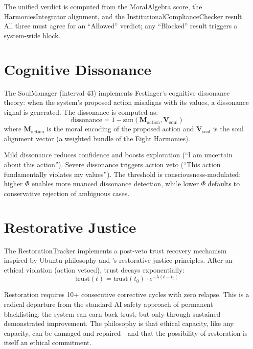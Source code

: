 \documentclass[12pt]{book}
\begin{document}
The unified verdict is computed from the MoralAlgebra score, the HarmoniesIntegrator alignment, and the InstitutionalComplianceChecker result. All three must agree for an ``Allowed'' verdict; any ``Blocked'' result triggers a system-wide block.

\section{Cognitive Dissonance}

The SoulManager (interval 43) implements Festinger's cognitive dissonance theory: when the system's proposed action misaligns with its values, a dissonance signal is generated. The dissonance is computed as:
\begin{equation}
\text{dissonance} = 1 - \text{sim}(\mathbf{M}_{\text{action}}, \mathbf{V}_{\text{soul}})
\end{equation}
where $\mathbf{M}_{\text{action}}$ is the moral encoding of the proposed action and $\mathbf{V}_{\text{soul}}$ is the soul alignment vector (a weighted bundle of the Eight Harmonies).

Mild dissonance reduces confidence and boosts exploration (``I am uncertain about this action''). Severe dissonance triggers action veto (``This action fundamentally violates my values''). The threshold is consciousness-modulated: higher $\Phi$ enables more nuanced dissonance detection, while lower $\Phi$ defaults to conservative rejection of ambiguous cases.

\section{Restorative Justice}

The RestorationTracker implements a post-veto trust recovery mechanism inspired by Ubuntu philosophy and \citet{zehr2002}'s restorative justice principles. After an ethical violation (action vetoed), trust decays exponentially:
\begin{equation}
\text{trust}(t) = \text{trust}(t_0) \cdot e^{-\lambda(t - t_0)}
\end{equation}

Restoration requires 10+ consecutive corrective cycles with zero relapse. This is a radical departure from the standard AI safety approach of permanent blacklisting: the system can earn back trust, but only through sustained demonstrated improvement. The philosophy is that ethical capacity, like any capacity, can be damaged and repaired---and that the possibility of restoration is itself an ethical commitment.
\end{document}
